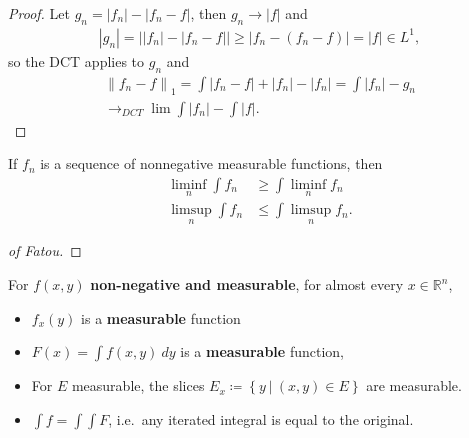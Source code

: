 \begin{proof}

Let
\(g_n = {\left\lvert {f_n} \right\rvert} - {\left\lvert {f_n - f} \right\rvert}\),
then \(g_n \to {\left\lvert {f} \right\rvert}\) and
\begin{align*}
{\left\lvert {g_n} \right\rvert} = {\left\lvert { {\left\lvert {f_n} \right\rvert} - {\left\lvert {f_n - f} \right\rvert} } \right\rvert} \geq {\left\lvert {f_n - (f_n - f)} \right\rvert} = {\left\lvert {f} \right\rvert} \in L^1
,\end{align*}
so the DCT applies to \(g_n\) and
\begin{align*}
{\left\lVert {f_n - f} \right\rVert}_1 = \int {\left\lvert {f_n - f} \right\rvert} + {\left\lvert {f_n} \right\rvert} - {\left\lvert {f_n} \right\rvert}
= \int {\left\lvert {f_n} \right\rvert} - g_n\\
\to_{DCT} \lim \int {\left\lvert {f_n} \right\rvert} - \int {\left\lvert {f} \right\rvert}
.\end{align*}

\end{proof}

\begin{theorem}[Fatou]

If \(f_n\) is a sequence of nonnegative measurable functions, then
\begin{align*}
\liminf_n \int f_n 
&\geq \int \liminf_n f_n \\
\limsup_n \int f_n &\leq \int \limsup_n f_n
.\end{align*}

\end{theorem}

\begin{proof}[of Fatou]


\end{proof}

\begin{theorem}

For \(f(x, y)\) \textbf{non-negative and measurable}, for almost every
\(x\in {\mathbb{R}}^n\),

\begin{itemize}
\tightlist
\item
  \(f_x(y)\) is a \textbf{measurable} function
\item
  \(F(x) = \int f(x, y) ~dy\) is a \textbf{measurable} function,
\item
  For \(E\) measurable, the slices
  \(E_x \coloneqq\left\{{y {~\mathrel{\Big|}~}(x, y) \in E}\right\}\)
  are measurable.
\item
  \(\int f = \int \int F\), i.e.~any iterated integral is equal to the
  original.
\end{itemize}

\end{theorem}

